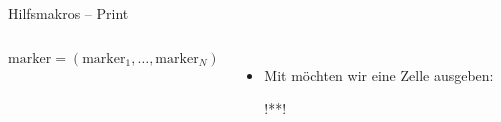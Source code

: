 \begin{frame}[c,fragile]{Hilfsmakros -- Print}
    \footnotesize\begin{columns}[c,onlytextwidth]%
\begin{algorithm}[H]
    \PreCode
    \StartCode
    \(\mathrm{marker} = (\mathrm{marker}_1, \ldots, \mathrm{marker}_N)\)\;
\end{algorithm}
\begin{itemize}[<+(1)->]
    \item Mit  möchten wir eine Zelle ausgeben:
\begin{plainxlatex}[morekeywords={[5]{\\i}}]
!**!\newcommand{\SievePrintCell}[1]{
  !*\onslide<4->*!\makebox[2em]{
    !*\onslide<5->*!\ifcsundef{marker@#1}{%
        !*\onslide<6->*!#1
    }
    !*\onslide<7->*!{\textcolor{gray}{#1}}
  !*\onslide<4->*!}
!*\onslide<3->*!}
\end{plainxlatex}
\end{itemize}
\end{columns}
\end{frame}

